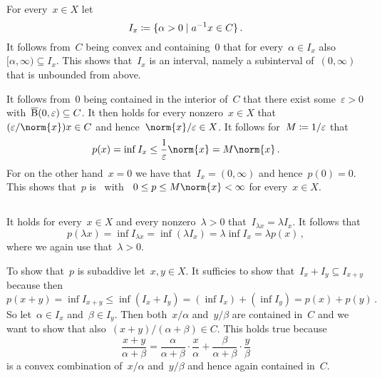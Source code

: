 \section{}





\subsection{}
For every~$x \in X$ let
\[
            I_x
  \defined  \{
              \alpha > 0
            \suchthat
              a^{-1} x \in C
            \} \,.
\]
It follows from~$C$ being convex and containing~$0$ that for every~$\alpha \in I_x$ also~$[\alpha,\infty) \subseteq I_x$.
This shows that~$I_x$ is an interval, namely a subinterval of~$(0,\infty)$ that is unbounded from above.

It follows from~$0$ being contained in the interior of~$C$ that there exist some~$\varepsilon > 0$ with~$\overline{\operatorname{B}}(0,\varepsilon) \subseteq C$.
It then holds for every nonzero~$x \in X$ that~$(\varepsilon/\norm{x}) x \in C$ and hence~$\norm{x}/\varepsilon \in X$.
It follows for~$M \coloneqq 1/\varepsilon$ that
\[
        p(x)
  =     \inf I_x
  \leq  \frac{1}{\varepsilon} \norm{x}
  =     M \norm{x} \,.
\]
For on the other hand~$x = 0$ we have that~$I_x = (0,\infty)$ and hence~$p(0) = 0$.
This shows that~$p$ is~{\welldef} with ~$0 \leq p \leq M \norm{x} < \infty$ for every~$x \in X$.





\subsection{}

It holds for every~$x \in X$ and every nonzero~$\lambda > 0$ that~$I_{\lambda x} = \lambda I_x$.
It follows that
\[
    p(\lambda x)
  = \inf I_{\lambda x}
  = \inf (\lambda I_x)
  = \lambda \inf I_x
  = \lambda p(x)  \,,
\]
where we again use that~$\lambda > 0$.

To show that~$p$ is subaddive let~$x, y \in X$.
It sufficies to show that~$I_x + I_y \subseteq I_{x+y}$ because then
\[
        p(x+y)
  =     \inf I_{x+y}
  \leq  \inf (I_x + I_y)
  =     (\inf I_x) + (\inf I_y)
  =     p(x) + p(y) \,.
\]
So let~$\alpha \in I_x$ and~$\beta \in I_y$.
Then both~$x/\alpha$ and~$y/\beta$ are contained in~$C$ and we want to show that also~$(x+y)/(\alpha + \beta) \in C$.
This holds true because
\[
    \frac{x+y}{\alpha + \beta}
  =   \frac{\alpha}{\alpha + \beta} \cdot \frac{x}{\alpha}
    + \frac{\beta}{\alpha + \beta} \cdot \frac{y}{\beta}
\]
is a convex combination of~$x/\alpha$ and~$y/\beta$ and hence again contained in~$C$.





